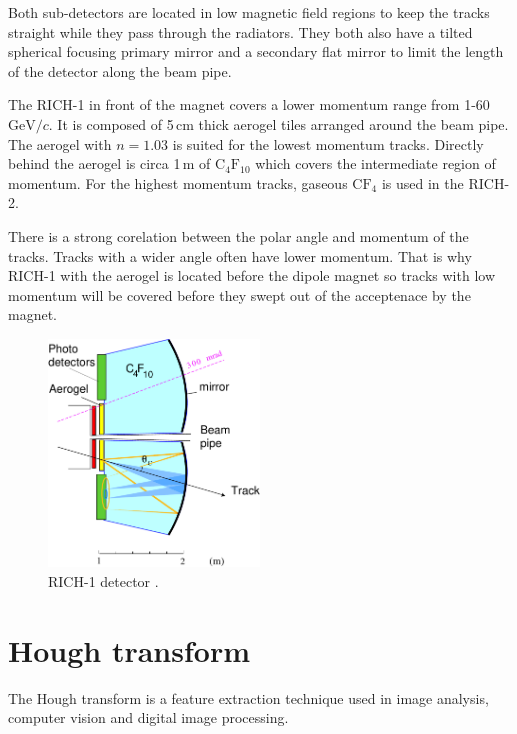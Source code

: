 \documentclass[11pt,twoside]{scrreprt}
\begin{document}
Both sub-detectors are located in low magnetic field regions to keep the tracks straight while they pass through the radiators. They both 
also have a tilted spherical focusing primary mirror and a secondary flat mirror to limit the length of the detector along the beam pipe.

The RICH-1 in front of the magnet covers a lower momentum range from 1-60 $\text{GeV}/c$. It is composed of 5\,cm thick aerogel tiles arranged around the beam pipe. The aerogel with $n=1.03$ is suited for the lowest momentum tracks. Directly behind the aerogel is circa 1\,m of $\text{C}_4\text{F}_{10}$ which covers the intermediate region of momentum.
For the highest momentum tracks, gaseous $\text{C}\text{F}_4$ is used in the RICH-2.

There is a strong corelation between the polar angle and momentum of the tracks. Tracks with a wider angle often have lower momentum. That is why RICH-1 with the aerogel is located before the dipole magnet so tracks with low momentum will be covered before they swept out of the acceptenace by the magnet.

\begin{figure}[tb]
  \centering
  \includegraphics[width=0.5\textwidth]{pics/rich1_schematic}
  \caption{RICH-1 detector \cite{LHCb:2000}.}
  \label{fig:rich1}
\end{figure}



\section{Hough transform} %
\label{sec:hough_transform}

The Hough transform is a feature extraction technique used in image analysis, computer vision and digital image processing.
\end{document}
